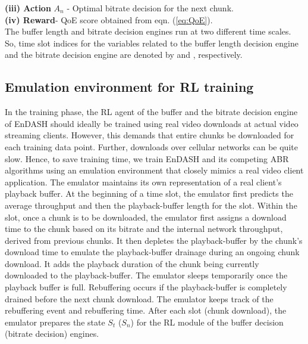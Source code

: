 \noindent\textbf{(iii) Action} $A_n$ - Optimal bitrate decision for the next chunk.\\ 
\noindent\textbf{(iv) Reward}- QoE score obtained from eqn. (\ref{eq:QoE}).\\
\indent The buffer length and bitrate decision engines run at two different time scales. So, time slot indices for the variables related to the buffer length decision engine and the bitrate decision engine are denoted by   and , respectively.
 \subsection{Emulation environment for \ac{RL} training}
  In the training phase, the \ac{RL} agent of the buffer and the bitrate decision engine of EnDASH should ideally be trained using real video downloads at actual video streaming clients. 
  However, this demands that entire chunks be downloaded for each training data point. Further, downloads over cellular networks can be quite slow. Hence, to save training time, we train EnDASH and its competing  ABR algorithms using an emulation environment that closely mimics a real video client application. The emulator maintains its own representation of a real client's playback buffer. At the beginning of a time slot, the emulator first predicts the average throughput and then the playback-buffer length for the slot. Within the slot, once a chunk is to be downloaded, the emulator first assigns a download time to the chunk based  on its bitrate and the internal network throughput, derived from previous chunks. It then depletes the playback-buffer by the chunk's download time to emulate the playback-buffer drainage during an ongoing chunk download. It adds the playback duration of the  chunk being currently downloaded to the playback-buffer. The emulator sleeps temporarily once the playback buffer is full. Rebuffering occurs if the playback-buffer is completely drained before the next chunk download. The emulator keeps track of the rebuffering event and rebuffering time. After each slot (chunk download), the emulator prepares the state $S_t$ ($S_n$) for the \ac{RL} module of the buffer decision (bitrate decision) engines.
